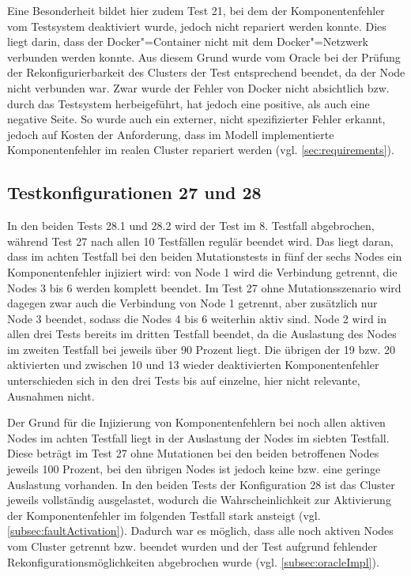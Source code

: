 Eine Besonderheit bildet hier zudem Test 21, bei dem der Komponentenfehler vom Testsystem deaktiviert wurde, jedoch nicht repariert werden konnte.
Dies liegt darin, dass der Docker"=Container nicht mit dem Docker"=Netzwerk verbunden werden konnte.
Aus diesem Grund wurde vom Oracle bei der Prüfung der Rekonfigurierbarkeit des Clusters der Test entsprechend beendet, da der Node nicht verbunden war.
Zwar wurde der Fehler von Docker nicht absichtlich bzw. durch das Testsystem herbeigeführt, hat jedoch eine positive, als auch eine negative Seite.
So wurde auch ein externer, nicht spezifizierter Fehler erkannt, jedoch auf Kosten der Anforderung, dass im Modell implementierte Komponentenfehler im realen Cluster repariert werden (vgl. \cref{sec:requirements}).

\subsection{Testkonfigurationen 27 und 28}
\label{subsec:noReconf2728}

In den beiden Tests 28.1 und 28.2 wird der Test im 8. Testfall abgebrochen, während Test 27 nach allen 10 Testfällen regulär beendet wird.
Das liegt daran, dass im achten Testfall bei den beiden Mutationstests in fünf der sechs Nodes ein Komponentenfehler injiziert wird: von Node 1 wird die Verbindung getrennt, die Nodes 3 bis 6 werden komplett beendet.
Im Test 27 ohne Mutationsszenario wird dagegen zwar auch die Verbindung von Node 1 getrennt, aber zusätzlich nur Node 3 beendet, sodass die Nodes 4 bis 6 weiterhin aktiv sind.
Node 2 wird in allen drei Tests bereits im dritten Testfall beendet, da die Auslastung des Nodes im zweiten Testfall bei jeweils über 90 Prozent liegt.
Die übrigen der 19 bzw. 20 aktivierten und zwischen 10 und 13 wieder deaktivierten Komponentenfehler unterschieden sich in den drei Tests bis auf einzelne, hier nicht relevante, Ausnahmen nicht.

Der Grund für die Injizierung von Komponentenfehlern bei noch allen aktiven Nodes im achten Testfall liegt in der Auslastung der Nodes im siebten Testfall.
Diese beträgt im Test 27 ohne Mutationen bei den beiden betroffenen Nodes jeweils 100 Prozent, bei den übrigen Nodes ist jedoch keine bzw. eine geringe Auslastung vorhanden.
In den beiden Tests der Konfiguration 28 ist das Cluster jeweils vollständig ausgelastet, wodurch die Wahrscheinlichkeit zur Aktivierung der Komponentenfehler im folgenden Testfall stark ansteigt (vgl. \cref{subsec:faultActivation}).
Dadurch war es möglich, dass alle noch aktiven Nodes vom Cluster getrennt bzw. beendet wurden und der Test aufgrund fehlender Rekonfigurationsmöglichkeiten abgebrochen wurde (vgl. \cref{subsec:oracleImpl}).

